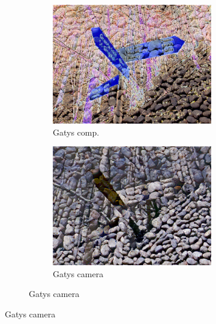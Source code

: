 \begin{figure}[]
\begin{subfigure}{\textwidth}
\begin{subfigure}{0.24\textwidth}
            \includegraphics[width=\textwidth]{images/04-experiment02/photo/pebbles/gatys_im.jpg}
            \caption*{Gatys comp.}
        \end{subfigure}
        \hfill
        \begin{subfigure}{0.24\textwidth}
            \centering
            \includegraphics[width=\textwidth]{images/04-experiment02/photo/pebbles/gatys_proj.jpg}
            \caption*{Gatys camera}
        \end{subfigure}
        

\end{subfigure}
\end{figure}
